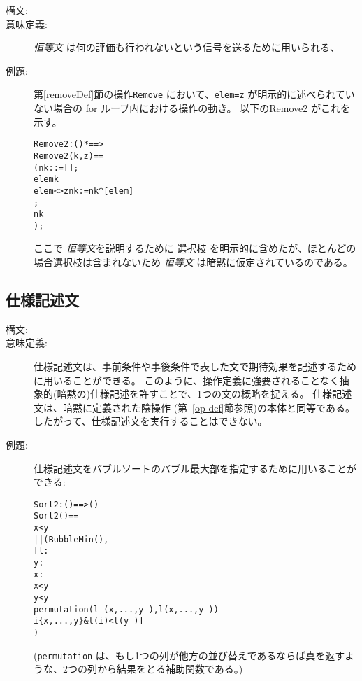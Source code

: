 \documentclass[\pformat,12pt]{jarticle}
\begin{document}
\begin{description}
\item[構文:]


\item[意味定義:]  {\it 恒等文\/} は何の評価も行われないという信号を送るために用いられる、

\item[例題:] 第\ref{removeDef}節の操作\texttt{Remove} において、\texttt{elem=z} が明示的に述べられていない場合の \textsf{for} ループ内における操作の動き。
以下の{Remove2} がこれを示す。
  \begin{alltt}
  Remove2 : () *  ==> 
  Remove2 (k,z) ==
    ( nk :  := [];
      elem  k 
        elem <> z  nk := nk^[elem]
       ;
      nk
    );
  \end{alltt}
ここで {\it 恒等文}を説明するために 選択枝 を明示的に含めたが、ほとんどの場合選択枝は含まれないため {\it 恒等文\/} は暗黙に仮定されているのである。

\end{description}


\subsection{仕様記述文} \label{se:specification}

\begin{description}
\item[構文:] 

\item[意味定義:] 

仕様記述文は、事前条件や事後条件で表した文で期待効果を記述するために用いることができる。
このように、操作定義に強要されることなく抽象的(暗黙の)仕様記述を許すことで、1つの文の概略を捉える。
仕様記述文は、暗黙に定義された陰操作 (第~\ref{op-def}節参照)の本体と同等である。したがって、仕様記述文を実行することはできない。

\item[例題:]  仕様記述文をバブルソートのバブル最大部を指定するために用いることができる:
  \begin{alltt}
  Sort2 : () ==> ()
  Sort2 () ==
     x < y 
      || (BubbleMin(),
          [ l : 
               y : 
               x : 
            x < y
            y < y~ 
                permutation (l~(x,...,y~),l(x,...,y~)) 
                 i  \{x,...,y\} & l(i) < l(y~)]
         )
  \end{alltt}
 (\texttt{permutation} は、もし1つの列が他方の並び替えであるならば真を返すような、2つの列から結果をとる補助関数である。)


\end{description}
\end{document}
